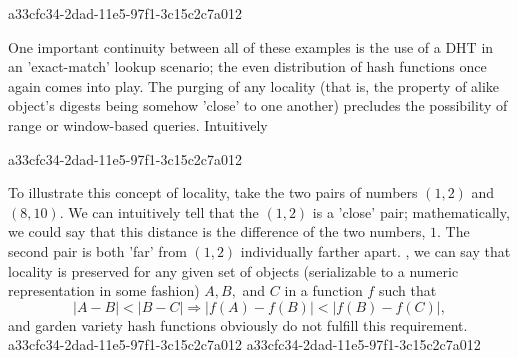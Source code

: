 \documentclass[12pt]{article}
\begin{document}
a33cfc34-2dad-11e5-97f1-3c15c2c7a012\par One important continuity between all of these examples is the use of a DHT in an 'exact-match' lookup scenario; the even distribution of hash functions once again comes into play. The purging of any locality (that is, the property of alike object's digests being somehow 'close' to one another) precludes the possibility of range or window-based queries. Intuitively

a33cfc34-2dad-11e5-97f1-3c15c2c7a012\par To illustrate this concept of locality, take the two pairs of numbers $(1,2)$ and $(8,10)$. We can intuitively tell that the $(1,2)$ is a 'close' pair; mathematically, we could say that this distance is the difference of the two numbers, $1$. The second pair is both 'far' from $(1,2)$ individually farther apart. , we can say that locality is preserved for any given set of objects (serializable to a numeric representation in some fashion) $A,B,$ and $C$ in a function $f$ such that
\begin{equation}
|A-B| < |B-C| \Rightarrow |f(A)-f(B)| < |f(B) - f(C)|,
\end{equation}
and garden variety hash functions obviously do not fulfill this requirement.
a33cfc34-2dad-11e5-97f1-3c15c2c7a012
a33cfc34-2dad-11e5-97f1-3c15c2c7a012\printbibliography
\end{document}
